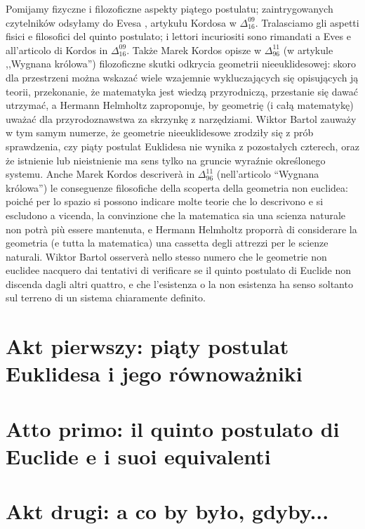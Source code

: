 Pomijamy fizyczne i filozoficzne aspekty piątego postulatu; zaintrygowanych czytelników odsyłamy do Evesa \cite[s. 314-317]{eves1_1972}, artykułu Kordosa w $\Delta_{16}^{09}$. %
Tralasciamo gli aspetti fisici e filosofici del quinto postulato; i lettori incuriositi sono rimandati a Eves \cite[p. 314-317]{eves1_1972} e all'articolo di Kordos in $\Delta_{16}^{09}$. %
Także Marek Kordos opisze w $\Delta_{96}^{11}$ (w artykule ,,Wygnana królowa'') filozoficzne skutki odkrycia geometrii nieeuklidesowej: skoro dla przestrzeni można wskazać wiele wzajemnie wykluczających się opisujących ją teorii, przekonanie, że matematyka jest wiedzą przyrodniczą, przestanie się dawać utrzymać, a Hermann Helmholtz zaproponuje, by geometrię (i całą matematykę) uważać dla przyrodoznawstwa za skrzynkę z narzędziami. Wiktor Bartol zauważy w tym samym numerze, że geometrie nieeuklidesowe zrodziły się z prób sprawdzenia, czy piąty postulat Euklidesa nie wynika z pozostałych czterech, oraz że istnienie lub nieistnienie ma sens tylko na gruncie wyraźnie określonego systemu. %
Anche Marek Kordos descriverà in $\Delta_{96}^{11}$ (nell'articolo ``Wygnana królowa'') le conseguenze filosofiche della scoperta della geometria non euclidea: poiché per lo spazio si possono indicare molte teorie che lo descrivono e si escludono a vicenda, la convinzione che la matematica sia una scienza naturale non potrà più essere mantenuta, e Hermann Helmholtz proporrà di considerare la geometria (e tutta la matematica) una cassetta degli attrezzi per le scienze naturali. Wiktor Bartol osserverà nello stesso numero che le geometrie non euclidee nacquero dai tentativi di verificare se il quinto postulato di Euclide non discenda dagli altri quattro, e che l'esistenza o la non esistenza ha senso soltanto sul terreno di un sistema chiaramente definito. %

\section{Akt pierwszy: piąty postulat Euklidesa i jego równoważniki} %
\section{Atto primo: il quinto postulato di Euclide e i suoi equivalenti} %


\section{Akt drugi: a co by było, gdyby...} %
